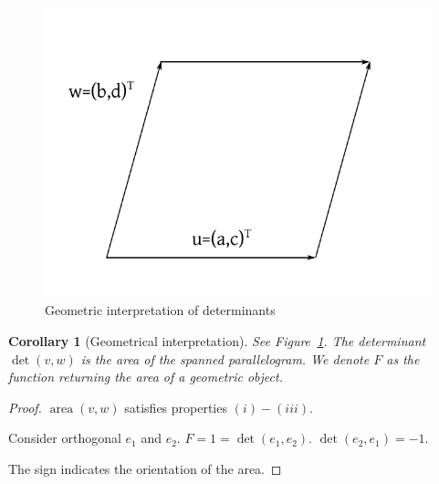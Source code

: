 \documentclass{article}
\newtheorem{corollary}{Corollary}  \numberwithin{corollary}{section}
\begin{document}
\begin{figure}[t]
  \begin{center}
    \includegraphics{img/01_geometric_interpretation_determinant.pdf}
    \caption{Geometric interpretation of determinants}
    \label{img:geo_det}
  \end{center}
\end{figure}

\begin{corollary}[Geometrical interpretation]
  See Figure~\ref{img:geo_det}.
  The determinant $\det(v,w)$ is the area of the spanned parallelogram.
  We denote $F$ as the function returning the area of a geometric object.
\end{corollary}

\begin{proof}
  $\operatorname{area}(v,w)$ satisfies properties $(i)-(iii)$.

  Consider orthogonal $e_1$ and $e_2$.
  $F = 1 = \det(e_1, e_2)$. $\det(e_2, e_1) = -1$.

  The sign indicates the orientation of the area.
\end{proof}
\end{document}
